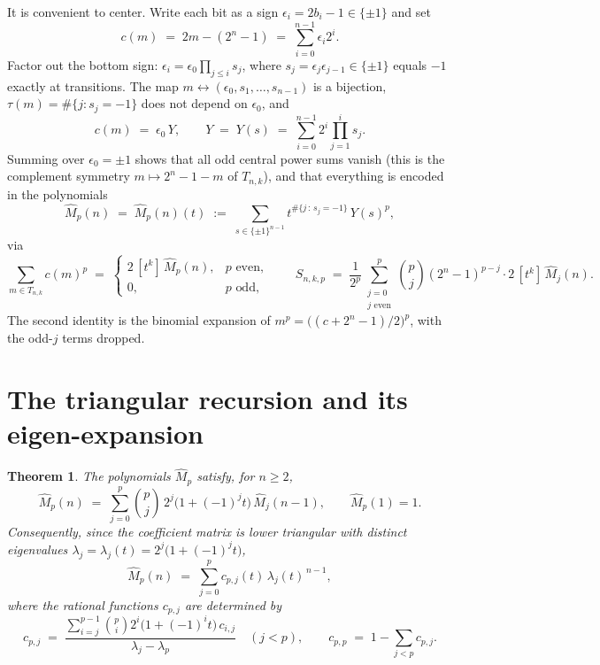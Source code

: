 \documentclass[11pt]{article}
\newtheorem{theorem}{Theorem}
\theoremstyle{remark}
\newcommand{\hM}{\widehat{M}}
\begin{document}
It is convenient to center. Write each bit as a sign $\epsilon_i = 2b_i - 1 \in \{\pm 1\}$ and set
\[
c(m) \;=\; 2m - (2^n - 1) \;=\; \sum_{i=0}^{n-1} \epsilon_i 2^i .
\]
Factor out the bottom sign: $\epsilon_i = \epsilon_0 \prod_{j \le i} s_j$, where
$s_j = \epsilon_j \epsilon_{j-1} \in \{\pm 1\}$ equals $-1$ exactly at transitions. The map
$m \leftrightarrow (\epsilon_0, s_1, \dots, s_{n-1})$ is a bijection, $\tau(m) = \#\{j : s_j = -1\}$
does not depend on $\epsilon_0$, and
\begin{equation}\label{eq:Y}
c(m) \;=\; \epsilon_0\, Y, \qquad
Y \;=\; Y(s) \;=\; \sum_{i=0}^{n-1} 2^i \prod_{j=1}^{i} s_j .
\end{equation}
Summing over $\epsilon_0 = \pm 1$ shows that all odd central power sums vanish (this is the
complement symmetry $m \mapsto 2^n - 1 - m$ of $T_{n,k}$), and that everything is encoded in the
polynomials
\[
\hM_p(n) \;=\; \hM_p(n)(t) \;:=\; \sum_{s \in \{\pm 1\}^{n-1}} t^{\#\{j\,:\,s_j = -1\}}\, Y(s)^p ,
\]
via
\begin{equation}\label{eq:bridge}
\sum_{m \in T_{n,k}} c(m)^p \;=\;
\begin{cases}
2\,[t^k]\, \hM_p(n), & p \text{ even},\\[2pt]
0, & p \text{ odd},
\end{cases}
\qquad
S_{n,k,p} \;=\; \frac{1}{2^p} \sum_{\substack{j = 0 \\ j \text{ even}}}^{p}
\binom{p}{j} (2^n - 1)^{p-j} \cdot 2\,[t^k]\,\hM_j(n) .
\end{equation}
The second identity is the binomial expansion of $m^p = \bigl((c + 2^n - 1)/2\bigr)^p$, with the
odd-$j$ terms dropped.

\section{The triangular recursion and its eigen-expansion}

\begin{theorem}\label{thm:main}
The polynomials $\hM_p$ satisfy, for $n \ge 2$,
\begin{equation}\label{eq:rec}
\hM_p(n) \;=\; \sum_{j=0}^{p} \binom{p}{j}\, 2^j \bigl(1 + (-1)^j t\bigr)\, \hM_j(n-1),
\qquad \hM_p(1) = 1 .
\end{equation}
Consequently, since the coefficient matrix is lower triangular with distinct eigenvalues
$\lambda_j = \lambda_j(t) = 2^j\bigl(1 + (-1)^j t\bigr)$,
\begin{equation}\label{eq:eigen}
\hM_p(n) \;=\; \sum_{j=0}^{p} c_{p,j}(t)\, \lambda_j(t)^{\,n-1},
\end{equation}
where the rational functions $c_{p,j}$ are determined by
\[
c_{p,j} \;=\; \frac{\displaystyle\sum_{i=j}^{p-1} \binom{p}{i} 2^i \bigl(1 + (-1)^i t\bigr)\, c_{i,j}}
{\lambda_j - \lambda_p} \quad (j < p),
\qquad
c_{p,p} \;=\; 1 - \sum_{j < p} c_{p,j} .
\]
\end{theorem}
\end{document}
